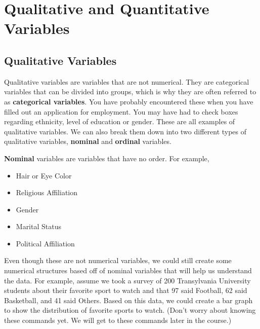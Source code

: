 \documentclass[
  letterpaper,
  DIV=11,
  numbers=noendperiod]{scrreprt}
\providecommand{\tightlist}{%
  \setlength{\itemsep}{0pt}\setlength{\parskip}{0pt}}\usepackage{longtable,booktabs,array}
\begin{document}

\chapter*{Qualitative and Quantitative
Variables}\label{qualitative-and-quantitative-variables}


\section*{Qualitative Variables}\label{qualitative-variables}


Qualitative variables are variables that are not numerical. They are
categorical variables that can be divided into groups, which is why they
are often referred to as \textbf{categorical variables}. You have
probably encountered these when you have filled out an application for
employment. You may have had to check boxes regarding ethnicity, level
of education or gender. These are all examples of qualitative variables.
We can also break them down into two different types of qualitative
variables, \textbf{nominal} and \textbf{ordinal} variables.

\textbf{Nominal} variables are variables that have no order. For
example,

\begin{itemize}
\tightlist
\item
  Hair or Eye Color
\item
  Religious Affiliation
\item
  Gender
\item
  Marital Status
\item
  Political Affiliation
\end{itemize}

Even though these are not numerical variables, we could still create
some numerical structures based off of nominal variables that will help
us understand the data. For example, assume we took a survey of 200
Transylvania University students about their favorite sport to watch and
that 97 said Football, 62 said Basketball, and 41 said Others. Based on
this data, we could create a bar graph to show the distribution of
favorite sports to watch. (Don't worry about knowing these commands yet.
We will get to these commands later in the course.)
\end{document}

